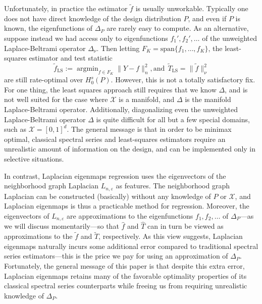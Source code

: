\documentclass{article}
\newcommand{\1}{\mathbf{1}}
\DeclareMathOperator*{\argmin}{argmin}
\newcommand{\mc}[1]{\mathcal{#1}}
\newcommand{\wt}[1]{\widetilde{#1}}
\newcommand{\wh}[1]{\widehat{#1}}
\theoremstyle{alden}
\theoremstyle{aldenthm}
\theoremstyle{definition}
\theoremstyle{remark}
\begin{document}
Unfortunately, in practice the estimator $\wt{f}$ is usually unworkable. Typically one does not have direct knowledge of the design distribution $P$, and even if $P$ is known, the eigenfunctions of $\Delta_P$ are rarely easy to compute. As an alternative, suppose instead we had access only to eigenfunctions $f_1',f_2',\ldots$ of the unweighted Laplace-Beltrami operator $\Delta_{\nu}$. Then letting $F_K = \mathrm{span}\{f_1,\ldots,f_K\}$, the least-squares estimator and test statistic
\begin{equation*}
\wt{f}_{\mathrm{LS}} := \argmin_{f \in F_K} \|Y - f\|_n^2,\textrm{and}~~\wt{T}_{\mathrm{LS}} = \|\wt{f}\|_{\nu}^2
\end{equation*}
are still rate-optimal over $H_0^s(P)$. However, this is not a totally satisfactory fix. For one thing, the least squares approach still requires that we know $\Delta$, and is not well suited for the case where $\mc{X}$ is a manifold, and $\Delta$ is the manifold Laplace-Beltrami operator. Additionally, diagonalizing even the unweighted Laplace-Beltrami operator $\Delta$ is quite difficult for all but a few special domains, such as $\mc{X} = [0,1]^d$. The general message is that in order to be minimax optimal, classical spectral series and least-squares estimators require an unrealistic amount of information on the design, and can be implemented only in selective situations. 

In contrast, Laplacian eigenmaps regression uses the eigenvectors of the neighborhood graph Laplacian $L_{n,\varepsilon}$ as features. The neighborhood graph Laplacian can be constructed (basically) without any knowledge of $P$ or $\mc{X}$, and Laplacian eigenmaps is thus a practicable method for regression. Moreover, the eigenvectors of $L_{n,\varepsilon}$ are approximations to the eigenfunctions $f_1,f_2,\ldots$ of $\Delta_P$---as we will discuss momentarily---so that $\wh{f}$ and $\wh{T}$ can in turn be viewed as approximations to the $\wt{f}$ and $\wt{T}$, respectively. As this view suggests, Laplacian eigenmaps naturally incurs some additional error compared to traditional spectral series estimators---this is the price we pay for using an approximation of $\Delta_P$. Fortunately, the general message of this paper is that despite this extra error, Laplacian eigenmaps retains many of the favorable optimality properties of its classical spectral series counterparts while freeing us from requiring unrealistic knowledge of $\Delta_P$. 
\end{document}

